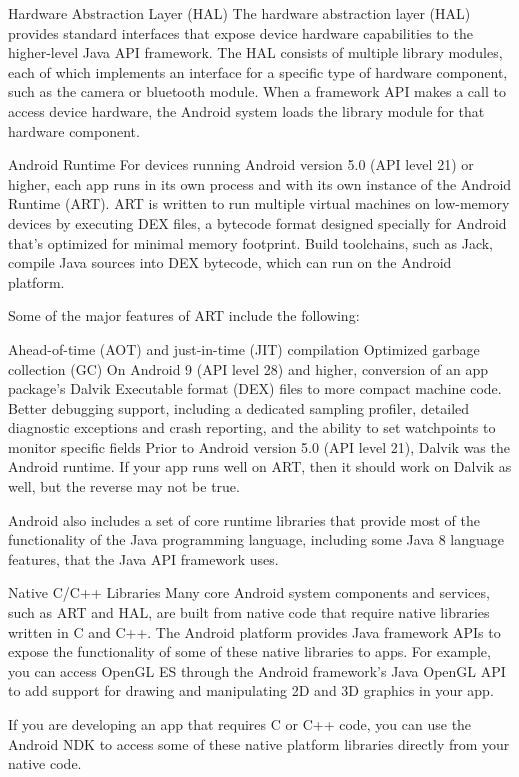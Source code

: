 Hardware Abstraction Layer (HAL)
The hardware abstraction layer (HAL) provides standard interfaces that expose device hardware capabilities to the higher-level Java API framework. The HAL consists of multiple library modules, each of which implements an interface for a specific type of hardware component, such as the camera or bluetooth module. When a framework API makes a call to access device hardware, the Android system loads the library module for that hardware component.

Android Runtime
For devices running Android version 5.0 (API level 21) or higher, each app runs in its own process and with its own instance of the Android Runtime (ART). ART is written to run multiple virtual machines on low-memory devices by executing DEX files, a bytecode format designed specially for Android that's optimized for minimal memory footprint. Build toolchains, such as Jack, compile Java sources into DEX bytecode, which can run on the Android platform.

Some of the major features of ART include the following:

Ahead-of-time (AOT) and just-in-time (JIT) compilation
Optimized garbage collection (GC)
On Android 9 (API level 28) and higher, conversion of an app package's Dalvik Executable format (DEX) files to more compact machine code.
Better debugging support, including a dedicated sampling profiler, detailed diagnostic exceptions and crash reporting, and the ability to set watchpoints to monitor specific fields
Prior to Android version 5.0 (API level 21), Dalvik was the Android runtime. If your app runs well on ART, then it should work on Dalvik as well, but the reverse may not be true.

Android also includes a set of core runtime libraries that provide most of the functionality of the Java programming language, including some Java 8 language features, that the Java API framework uses.

Native C/C++ Libraries
Many core Android system components and services, such as ART and HAL, are built from native code that require native libraries written in C and C++. The Android platform provides Java framework APIs to expose the functionality of some of these native libraries to apps. For example, you can access OpenGL ES through the Android framework’s Java OpenGL API to add support for drawing and manipulating 2D and 3D graphics in your app.

If you are developing an app that requires C or C++ code, you can use the Android NDK to access some of these native platform libraries directly from your native code.

